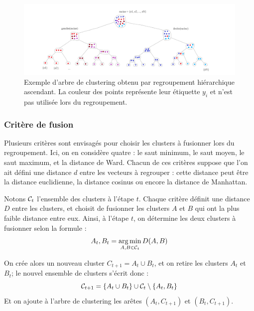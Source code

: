 \begin{figure}[h]
    \centering
    \includegraphics[width=\textwidth]{img/clustering_tree.png}
    \caption[Principe du regroupement hiérarchique ascendant]{Exemple d'arbre de clustering obtenu par regroupement hiérarchique ascendant. La couleur des points représente leur étiquette $y_i$ et n'est pas utilisée lors du regroupement.}
    \label{fig:clustering_tree}
\end{figure}


\subsubsection{Critère de fusion}
\label{sec:te-clustering-linkage}

Plusieurs critères sont envisagés pour choisir les clusters à fusionner lors du regroupement. Ici, on en considère quatre : le saut minimum, le saut moyen, le saut maximum, et la distance de Ward. Chacun de ces critères suppose que l'on ait défini une distance $d$ entre les vecteurs à regrouper : cette distance peut être la distance euclidienne, la distance cosinus ou encore la distance de Manhattan. 

Notons $\cal{C}_t$ l'ensemble des clusters à l'étape $t$. Chaque critère définit une distance $D$ entre les clusters, et choisit de fusionner les clusters $A$ et $B$ qui ont la plus faible distance entre eux. Ainsi, à l'étape $t$, on détermine les deux clusters à fusionner selon la formule :
\begin{equation}
    A_t, B_t = \argmin_{A, B \in \cal{C}_t} D(A, B)
\end{equation}

On crée alors un nouveau cluster $C_{t+1} = A_t \cup B_t$, et on retire les clusters $A_t$ et $B_t$; le nouvel ensemble de clusters s'écrit donc :
\begin{equation}
    \cal{C}_{t+1} = \{ A_t \cup B_t \} \cup \cal{C}_t \setminus \{ A_t, B_t \}
\end{equation}
Et on ajoute à l'arbre de clustering les arêtes $(A_t, C_{t+1})$ et $(B_t, C_{t+1})$.

